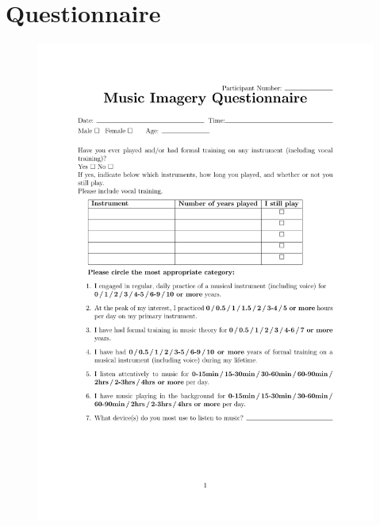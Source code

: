 \chapter{Questionnaire}\label{appendix:questionnaire}

\begin{figure}[h]
   \centerline{\includegraphics[page=1,scale=0.75,trim={0.75in 2in 0.75in 1in},clip]{Figures/questionnaire.pdf}}
\end{figure}

%

